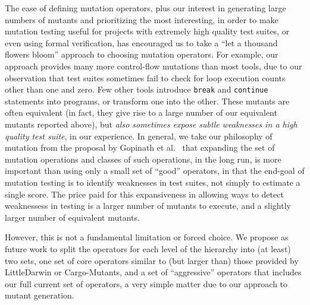 \documentclass[acmsmall,screen,review,anonymous]{acmart}
\begin{document}
{The ease of defining mutation operators,
plus our interest in generating large numbers of mutants and
prioritizing the most interesting, in order to make mutation testing useful for
projects with extremely high quality test suites, or even using formal
verification, has encouraged us to take a ``let a thousand flowers bloom''
approach to choosing mutation operators.  For example, our approach
provides many more control-flow mutations than most tools, due to our
observation that test suites sometimes fail to check for loop
execution counts other than one and zero.  Few other tools introduce
{\tt break} and {\tt continue} statements into programs, or transform
one into the other.  These mutants are often equivalent (in fact, they
give rise to a large number of our equivalent mutants reported above), but \emph{also
sometimes expose subtle weaknesses in a high quality test suite}, in our
experience.  In general, we take our philosophy of mutation from the
proposal by Gopinath et al.~\cite{Limits,gopinath2017mutation} that
expanding the set of mutation operations and classes of such
operations, in the long run, is more important than using only a small
set of ``good'' operators, in that the end-goal of mutation testing is
to identify weaknesses in test suites, not simply to estimate a single
score.   The price paid for this
expansiveness in allowing ways to detect weaknessess in testing is a
larger number of mutants to execute, and a slightly larger number of
equivalent mutants.


However, this is not a
fundamental limitation or forced choice.  We propose as future work to
split the operators for each level of the hierarchy into (at least) two sets, one
set of core operators similar to (but larger than) those provided by
LittleDarwin or Cargo-Mutants, and a set of ``aggressive'' operators
that includes our full current set of operators, a very simple matter due to
our approach to mutant generation.

}
\end{document}
